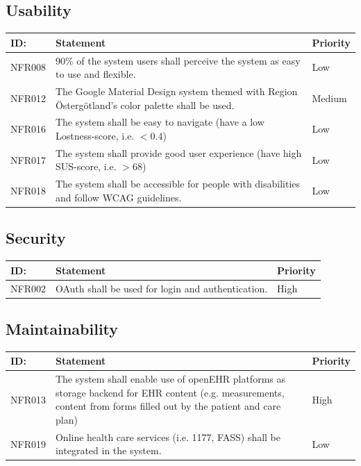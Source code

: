\documentclass{scrreprt}
\begin{document}
\subsection{Usability}

\begin{center}
\begin{tabularx}{\linewidth}{| l | X | l |}
\hline
\textbf{ID:} & \textbf{Statement} & \textbf{Priority} \\
\hline
NFR008 & 
90\% of the system users shall perceive the system as easy to use and flexible. & 
Low \\ 
\hline
NFR012 & 
The Google Material Design system themed with Region Östergötland’s color palette shall be used. & 
Medium \\ 
\hline
NFR016 & 
The system shall be easy to navigate (have a low Lostness-score, i.e. $< 0.4$) &
Low \\ 
\hline
NFR017 & 
The system shall provide good user experience (have high SUS-score, i.e. $> 68$) & 
Low \\ 
\hline
NFR018 & 
The system shall be accessible for people with disabilities and follow WCAG guidelines. &
Low \\ 
\hline
\end{tabularx}
\end{center}

\subsection{Security}

\begin{center}
\begin{tabularx}{\linewidth}{| l | X | l |}
\hline
\textbf{ID:} & \textbf{Statement} & \textbf{Priority} \\
\hline
NFR002 & 
OAuth shall be used for login and authentication. &
High \\ 
 \hline
\end{tabularx}
\end{center}

\subsection{Maintainability}

\begin{center}
\begin{tabularx}{\linewidth}{| l | X | l |}
\hline
\textbf{ID:} & \textbf{Statement} & \textbf{Priority} \\
\hline
NFR013 & 
The system shall enable use of openEHR platforms as storage backend for EHR content (e.g. measurements, content from forms filled out by the patient and care plan) &
High \\ 
\hline
NFR019 & 
Online health care services (i.e. 1177, FASS) shall be integrated in the system. & 
Low \\ 
\hline
\end{tabularx}
\end{center}
\end{document}
